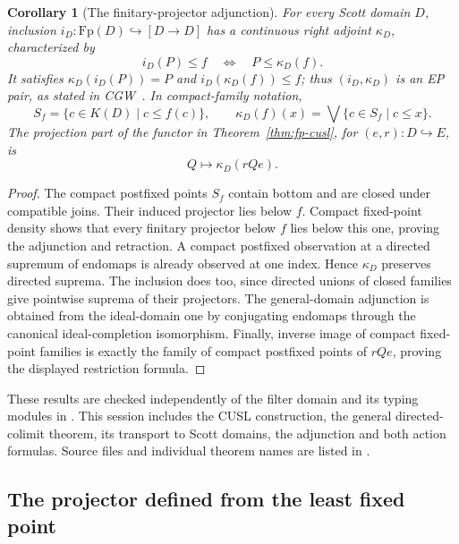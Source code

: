 \documentclass[11pt,a4paper]{article}
\newtheorem{corollary}[theorem]{Corollary}
\theoremstyle{definition}
\theoremstyle{remark}
\newcommand{\lub}{\bigvee}
\begin{document}
\begin{corollary}[The finitary-projector adjunction]\label{cor:fp-adjunction}
For every Scott domain $D$, inclusion
$i_D:\mathrm{Fp}(D)\hookrightarrow[D\to D]$ has a continuous right
adjoint $\kappa_D$, characterized by
\[
 i_D(P)\leq f\quad\Longleftrightarrow\quad P\leq\kappa_D(f).
\]
It satisfies $\kappa_D(i_D(P))=P$ and $i_D(\kappa_D(f))\leq f$;
thus $(i_D,\kappa_D)$ is an EP pair, as stated in
CGW~\cite[p.~162]{cgw}. In compact-family notation,
\[
 S_f=\{c\in K(D)\mid c\leq f(c)\},\qquad
 \kappa_D(f)(x)=\lub\{c\in S_f\mid c\leq x\}.
\]
The projection part of the functor in Theorem~\ref{thm:fp-cusl}, for
$(e,r):D\hookrightarrow E$, is
\[
 Q\longmapsto\kappa_D(rQe).
\]
\end{corollary}
\begin{proof}
The compact postfixed points $S_f$ contain bottom and are closed under
compatible joins. Their induced projector lies below $f$.
Compact fixed-point density shows that every finitary projector below
$f$ lies below this one, proving the adjunction and retraction.
A compact postfixed observation at a directed supremum of endomaps is
already observed at one index. Hence $\kappa_D$ preserves directed
suprema. The inclusion does too, since directed unions of closed
families give pointwise suprema of their projectors.
The general-domain adjunction is obtained from the ideal-domain one
by conjugating endomaps through the canonical ideal-completion
isomorphism. Finally, inverse image of compact fixed-point families
is exactly the family of compact postfixed points of $rQe$, proving
the displayed restriction formula.
\end{proof}

These results are checked independently of the filter domain and its
typing modules in . This session includes the
CUSL construction, the general directed-colimit theorem, its transport
to Scott domains, the adjunction and both action formulas. Source files
and individual theorem names are listed in .

\subsection{The projector defined from the least fixed point}
\end{document}
